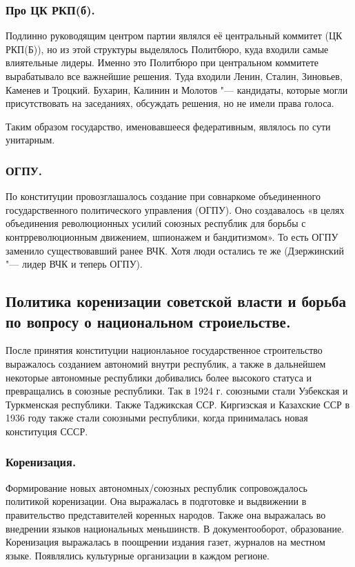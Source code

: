 \subsubsection{\textbf{Про ЦК РКП(б).}}

Подлинно руководящим центром партии являлся её центральный коммитет (ЦК РКП(Б)), но из этой структуры выделялось Политбюро, куда входили самые влиятельные лидеры. Именно это Политбюро при центральном коммитете вырабатывало все важнейшие решения. Туда входили Ленин, Сталин, Зиновьев, Каменев и Троцкий. Бухарин, Калинин и Молотов "--- кандидаты, которые могли присутствовать на заседаниях, обсуждать решения, но не имели права голоса.

Таким образом государство, именовавшееся федеративным, являлось по сути унитарным.

\subsubsection{\textbf{ОГПУ.}}

По конституции провозглашалось создание при совнаркоме объединенного государственного политического управления (ОГПУ). Оно создавалось «в целях объединения революционных усилий союзных республик для борьбы с контрреволюционным движением, шпионажем и бандитизмом». То есть ОГПУ заменило существовавший ранее ВЧК. Хотя люди остались те же (Дзержинский "--- лидер ВЧК и теперь ОГПУ).

\subsection{Политика коренизации советской власти и борьба по вопросу о национальном строиельстве.}

После принятия конституции национлаьное государственное строительство выражалось созданием автономий внутри республик, а также в дальнейшем некоторые автономные республики добивались более высокого статуса и превращались в союзные республики. Так в 1924 г. союзными стали Узбекская и Туркменская республики. Также Таджикская ССР. Киргизская и Казахские ССР в 1936 году также стали союзными республики, когда принималась новая конституция СССР.

\subsubsection{\textbf{Коренизация.}}

Формирование новых автономных/союзных республик сопровождалось политикой коренизации. Она выражалась в подготовке и выдвижении в правительство представителей коренных народов. Также она выражалась во внедрении языков национальных меньшинств. В документооборот, образование. Коренизация выражалась в поощрении издания газет, журналов на местном языке. Появлялись культурные организации в каждом регионе.

